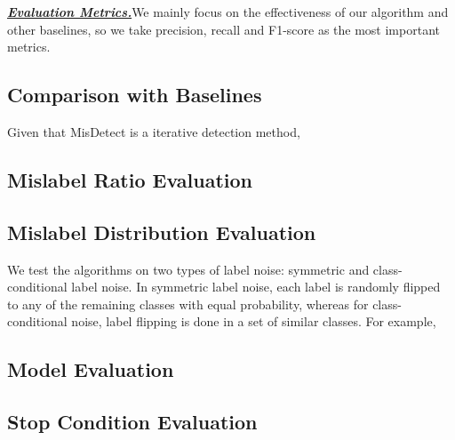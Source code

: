 \textbf{\textit{\underline{Evaluation Metrics.}}}We mainly focus on the effectiveness of our algorithm and other baselines, so we take precision, recall and F1-score as the most important metrics.

\subsection{Comparison with Baselines}

Given that MisDetect is a iterative detection method,

\subsection{Mislabel Ratio Evaluation}

\subsection{Mislabel Distribution Evaluation}

We test the algorithms on two types of label noise: symmetric and class-conditional label noise. In symmetric label noise, each label is randomly flipped to any of the remaining classes with equal probability, whereas for class-conditional noise, label flipping is done in a set of similar classes. For example, 

\subsection{Model Evaluation}

\subsection{Stop Condition Evaluation}
